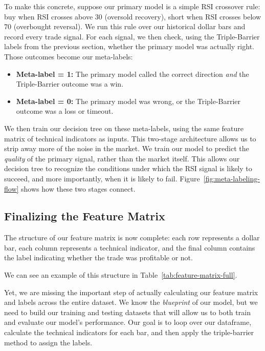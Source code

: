 To make this concrete, suppose our primary model is a simple RSI crossover rule: buy when RSI crosses above 30 (oversold recovery), short when RSI crosses below 70 (overbought reversal).
We run this rule over our historical dollar bars and record every trade signal. 
For each signal, we then check, using the Triple-Barrier labels from the previous section, whether the primary model was actually right. 
Those outcomes become our meta-labels:
 
\begin{itemize}
  \item \textbf{Meta-label = 1:} The primary model called the correct direction \textit{and} the Triple-Barrier outcome was a win.
  \item \textbf{Meta-label = 0:} The primary model was wrong, or the Triple-Barrier outcome was a loss or timeout.
\end{itemize}

We then train our decision tree on these meta-labels, using the same feature matrix of technical indicators as inputs. 
This two-stage architecture allows us to strip away more of the noise in the market. We train our model to predict the \textit{quality} of the primary signal, rather than the market itself.
This allows our decision tree to recognize the conditions under which the RSI signal is likely to succeed, and more importantly, when it is likely to fail.
Figure~\ref{fig:meta-labeling-flow} shows how these two stages connect.



\subsection{Finalizing the Feature Matrix}



The structure of our feature matrix is now complete: each row represents a dollar bar, each column represents a technical indicator, and the final column contains the label indicating whether the trade was profitable or not.

We can see an example of this structure in Table~\ref{tab:feature-matrix-full}.

Yet, we are missing the important step of actually calculating our feature matrix and labels across the entire dataset.
We know the \textit{blueprint} of our model, but we need to build our training and testing datasets that will allow us to both train and evaluate our model's performance. 
Our goal is to loop over our dataframe, calculate the technical indicators for each bar, and then apply the triple-barrier method to assign the labels. 

